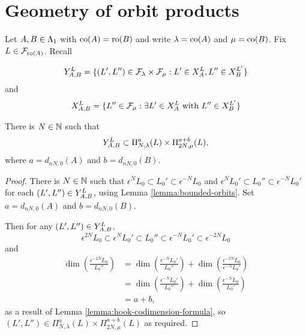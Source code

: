 \documentclass[a4paper, 11pt]{report}
\begin{document}
\section{Geometry of orbit products}

Let $A,B\in\matrices$ with $\co{A}=\ro{B}$ and write $\lambda=\co{A}$ and $\mu=\co{B}$. Fix $L\in\flags_{\ro{A}}$. Recall

\begin{equation*}
\yprod[L]{A,B}=\{(L',L'')\in\flags_{\lambda}\times\flags_{\mu}: L'\in\xprod[L]{A}, L''\in\xprod[L']{B}\}
\end{equation*}
and
\begin{equation*}
\xprod[L]{A,B}=\{L''\in\flags_{\mu}: \exists L'\in\xprod[L]{A} \text{ with } L''\in\xprod[L']{B}\}
\end{equation*}

\begin{lemma}\label{lemma:embedding-orbit-products}
There is $N\in\naturals$ such that
\begin{equation*}
\yprod[L]{A,B}\subset\Pi_{N,\lambda}^a(L)\times\Pi_{2N,\mu}^{a+b}(L),
\end{equation*}
where $a=d_{nN,0}{(A)}$ and $b=d_{nN,0}{(B)}$.
\end{lemma}

\begin{proof}
There is $N\in\naturals$ such that $\epsilon^N{L_0}\subset L_0'\subset\epsilon^{-N}L_0$ and $\epsilon^NL_0'\subset L_0''\subset\epsilon^{-N}L_0'$ for each $(L',L'')\in\yprod[L]{A,B}$, using Lemma \ref{lemma:bounded-orbits}. Set $a=d_{nN,0}{(A)}$ and $b=d_{nN,0}{(B)}$.

Then for any $(L',L'')\in\yprod[L]{A,B}$,
\begin{equation*}
\epsilon^{2N}L_0\subset\epsilon^NL_0'\subset L_0''\subset\epsilon^{-N}L_0'\subset\epsilon^{-2N}L_0
\end{equation*}
and
\begin{align*}
\dim\left(\frac{\epsilon^{-2N}L_0}{L_0''}\right)
&=\dim\left(\frac{\epsilon^{-N}L_0'}{L_0''}\right) + \dim\left(\frac{\epsilon^{-2N}L_0}{\epsilon^{-N}L_0'}\right)\\
&=\dim\left(\frac{\epsilon^{-N}L_0'}{L_0''}\right) + \dim\left(\frac{\epsilon^{-N}L_0}{L_0'}\right)\\
&= a+b,
\end{align*}
as a result of Lemma \ref{lemma:hook-codimension-formula}, so $(L',L'')\in\Pi_{N,\lambda}^a(L)\times\Pi_{2N,\mu}^{a+b}(L)$ as required.
\end{proof}
\end{document}

